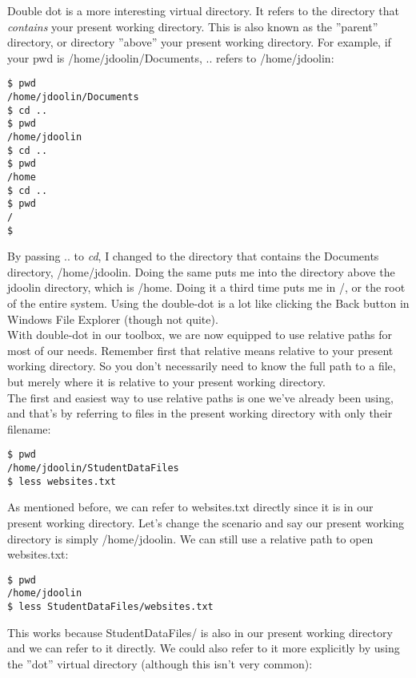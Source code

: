 Double dot is a more interesting virtual directory.  It refers to the directory that \textit{contains} your present working directory.  This is also known as the ''parent'' directory, or directory ''above'' your present working directory.  For example, if your pwd is /home/jdoolin/Documents, .. refers to /home/jdoolin:

\begin{verbatim}
$ pwd
/home/jdoolin/Documents
$ cd ..
$ pwd
/home/jdoolin
$ cd ..
$ pwd
/home
$ cd ..
$ pwd
/
$
\end{verbatim}

By passing .. to \textit{cd}, I changed to the directory that contains the Documents directory, /home/jdoolin.  Doing the same puts me into the directory above the jdoolin directory, which is /home.  Doing it a third time puts me in /, or the root of the entire system.  Using the double-dot is a lot like clicking the Back button in Windows File Explorer (though not quite).\\

With double-dot in our toolbox, we are now equipped to use relative paths for most of our needs.  Remember first that relative means relative to your present working directory.  So you don't necessarily need to know the full path to a file, but merely where it is relative to your present working directory.\\

The first and easiest way to use relative paths is one we've already been using, and that's by referring to files in the present working directory with only their filename:

\begin{verbatim}
$ pwd
/home/jdoolin/StudentDataFiles
$ less websites.txt
\end{verbatim}

As mentioned before, we can refer to websites.txt directly since it is in our present working directory.  Let's change the scenario and say our present working directory is simply /home/jdoolin.  We can still use a relative path to open websites.txt:

\begin{verbatim}
$ pwd
/home/jdoolin
$ less StudentDataFiles/websites.txt
\end{verbatim}

This works because StudentDataFiles/ is also in our present working directory and we can refer to it directly.  We could also refer to it more explicitly by using the ''dot'' virtual directory (although this isn't very common):

